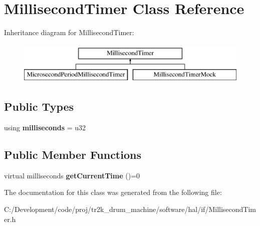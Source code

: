 \hypertarget{class_millisecond_timer}{}\section{Millisecond\+Timer Class Reference}
\label{class_millisecond_timer}
Inheritance diagram for Millisecond\+Timer\+:\begin{figure}[H]
\begin{center}
\leavevmode
\includegraphics[height=2.000000cm]{class_millisecond_timer}
\end{center}
\end{figure}
\subsection*{Public Types}
\begin{DoxyCompactItemize}
\item 
\mbox{\label{class_millisecond_timer_a3f9614489f4bbf33e5fea032edcf94b9}} 
using {\bfseries milliseconds} = u32
\end{DoxyCompactItemize}
\subsection*{Public Member Functions}
\begin{DoxyCompactItemize}
\item 
\mbox{\label{class_millisecond_timer_a53082bb27a211713de2ee5318f23e2b0}} 
virtual milliseconds {\bfseries get\+Current\+Time} ()=0
\end{DoxyCompactItemize}


The documentation for this class was generated from the following file\+:\begin{DoxyCompactItemize}
\item 
C\+:/\+Development/code/proj/tr2k\+\_\+drum\+\_\+machine/software/hal/if/Millisecond\+Timer.\+h\end{DoxyCompactItemize}
